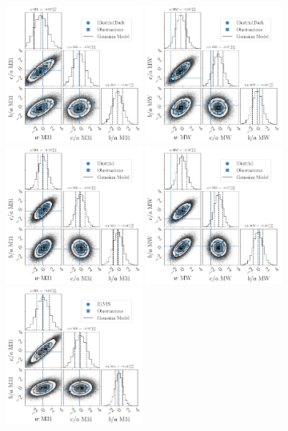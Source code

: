\documentclass[a4paper,fleqn,usenatbib]{mnras}
\begin{document}
\begin{figure}
\centering
\includegraphics[width=0.40\textwidth]{gaussian_model_illustris1dark_M31_n_12.pdf}
\includegraphics[width=0.40\textwidth]{gaussian_model_illustris1dark_MW_n_12.pdf}
\includegraphics[width=0.40\textwidth]{gaussian_model_illustris1_M31_n_12.pdf}
\includegraphics[width=0.40\textwidth]{gaussian_model_illustris1_MW_n_12.pdf}
\includegraphics[width=0.40\textwidth]{gaussian_model_elvis_M31_n_12.pdf}

\end{figure}
\end{document}
